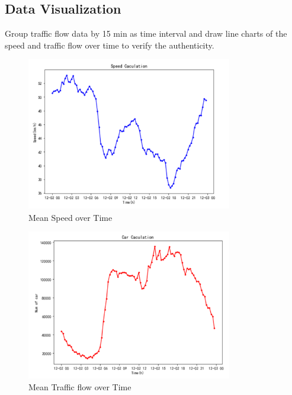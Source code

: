 \documentclass[fontset=none]{ctexart}
\theoremstyle{definition}
\theoremstyle{remark}
\begin{document}
\subsection{Data Visualization}
Group traffic flow data by 15 min as time interval and draw line charts of the speed and traffic flow over time to verify the authenticity.
\clearpage
\begin{figure}[t]
  \centering
  \includegraphics[width=0.8\textwidth]{images/7-3-3.png}
  \caption{Mean Speed over Time}
  \label{fig: 733}
\end{figure}
\begin{figure}[b]
  \centering
  \includegraphics[width=0.8\textwidth]{images/7-3-4.png}
  \caption{Mean Traffic flow over Time}
  \label{fig: 734}
\end{figure}
\end{document}
